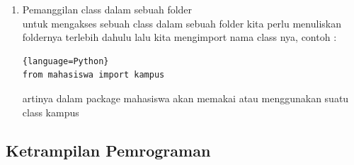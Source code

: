 \documentclass[a4paper, 12pt]{article}
\begin{document}
\begin{enumerate}
			\item Pemanggilan class dalam sebuah folder\\
			untuk mengakses sebuah class dalam sebuah folder kita perlu menuliskan foldernya terlebih dahulu lalu kita  mengimport nama class nya, contoh :
			\begin{lstlisting}{language=Python}
from mahasiswa import kampus
			\end{lstlisting}
artinya dalam package mahasiswa akan memakai atau menggunakan suatu class kampus
			
			\end{enumerate}

    \newpage			
	\subsection{Ketrampilan Pemrograman}
\end{document}
